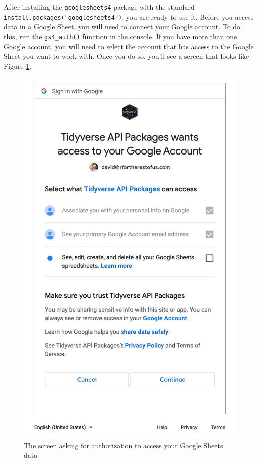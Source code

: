 \documentclass[
]{book}
\begin{document}
After installing the \texttt{googlesheets4} package with the standard \texttt{install.packages("googlesheets4")}, you are ready to use it. Before you access data in a Google Sheet, you will need to connect your Google account. To do this, run the \texttt{gs4\_auth()} function in the console. If you have more than one Google account, you will need to select the account that has access to the Google Sheet you want to work with. Once you do so, you'll see a screen that looks like Figure \ref{fig:tidyverse-access-r}.

\begin{figure}
\includegraphics[width=1\linewidth]{assets/tidyverse-access-r} \caption{The screen asking for authorization to access your Google Sheets data}\label{fig:tidyverse-access-r}
\end{figure}
\end{document}
